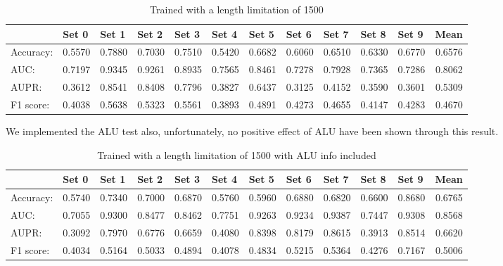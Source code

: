 \documentclass[10pt,a4paper]{article}
\begin{document}
\begin{spacing}{1.5}
		\begin{table}[H]
			\centering
			\caption{Trained with a length limitation of 1500}
			\begin{tabular}{l|rrrrrrrrrr|r}
				& \multicolumn{1}{l}{Set 0} & \multicolumn{1}{l}{Set 1} & \multicolumn{1}{l}{Set 2} & \multicolumn{1}{l}{Set 3} & \multicolumn{1}{l}{Set 4} & \multicolumn{1}{l}{Set 5} & \multicolumn{1}{l}{Set 6} & \multicolumn{1}{l}{Set 7} & \multicolumn{1}{l}{Set 8} & \multicolumn{1}{l}{Set 9} & \multicolumn{1}{l}{Mean} \\ \hline \hline
				Accuracy: & 0.5570  & 0.7880  & 0.7030  & 0.7510  & 0.5420  & 0.6682  & 0.6060  & 0.6510  & 0.6330  & 0.6770  & 0.6576  \\
				AUC:  & 0.7197  & 0.9345  & 0.9261  & 0.8935  & 0.7565  & 0.8461  & 0.7278  & 0.7928  & 0.7365  & 0.7286  & 0.8062  \\
				AUPR: & 0.3612  & 0.8541  & 0.8408  & 0.7796  & 0.3827  & 0.6437  & 0.3125  & 0.4152  & 0.3590  & 0.3601  & 0.5309  \\
				F1 score: & 0.4038  & 0.5638  & 0.5323  & 0.5561  & 0.3893  & 0.4891  & 0.4273  & 0.4655  & 0.4147  & 0.4283  & 0.4670  \\
			\end{tabular}%
			\label{tab:addlabel}%
		\end{table}%
		
		We implemented the ALU test also, unfortunately, no positive effect of ALU have been shown through this result.
		
		\begin{table}[H]
			\centering
			\caption{Trained with a length limitation of 1500 with ALU info included}
			\begin{tabular}{l|rrrrrrrrrr|r}
				& \multicolumn{1}{l}{Set 0} & \multicolumn{1}{l}{Set 1} & \multicolumn{1}{l}{Set 2} & \multicolumn{1}{l}{Set 3} & \multicolumn{1}{l}{Set 4} & \multicolumn{1}{l}{Set 5} & \multicolumn{1}{l}{Set 6} & \multicolumn{1}{l}{Set 7} & \multicolumn{1}{l}{Set 8} & \multicolumn{1}{l}{Set 9} & \multicolumn{1}{l}{Mean} \\ \hline \hline
				Accuracy: & 0.5740  & 0.7340  & 0.7000  & 0.6870  & 0.5760  & 0.5960  & 0.6880  & 0.6820  & 0.6600  & 0.8680  & 0.6765  \\
				AUC:  & 0.7055  & 0.9300  & 0.8477  & 0.8462  & 0.7751  & 0.9263  & 0.9234  & 0.9387  & 0.7447  & 0.9308  & 0.8568  \\
				AUPR: & 0.3092  & 0.7970  & 0.6776  & 0.6659  & 0.4080  & 0.8398  & 0.8179  & 0.8615  & 0.3913  & 0.8514  & 0.6620  \\
				F1 score: & 0.4034  & 0.5164  & 0.5033  & 0.4894  & 0.4078  & 0.4834  & 0.5215  & 0.5364  & 0.4276  & 0.7167  & 0.5006  \\
			\end{tabular}%
			\label{tab:addlabel}%
		\end{table}%
		

\end{spacing}
\end{document}
